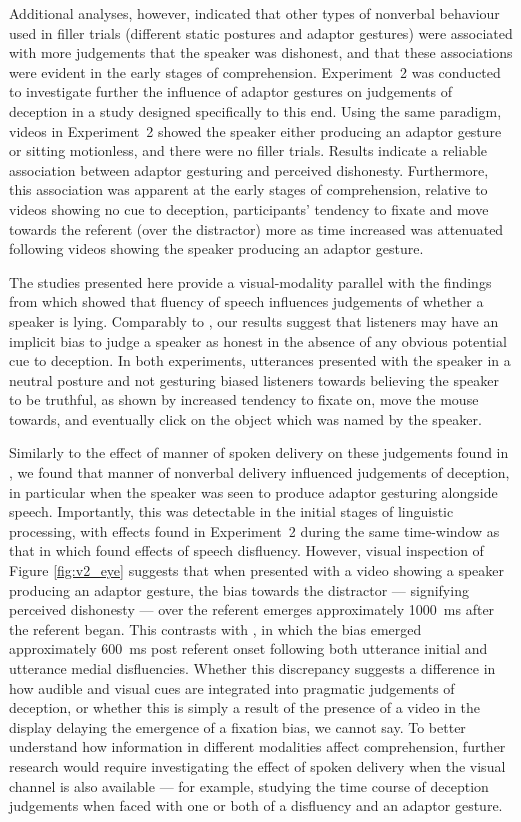 \documentclass[a4paper,man,natbib]{apa6}
\begin{document}
Additional analyses, however, indicated that other types of nonverbal behaviour used in filler trials (different static postures and adaptor gestures) were associated with more judgements that the speaker was dishonest, and that these associations were evident in the early stages of comprehension.
Experiment~2 was conducted to investigate further the influence of adaptor gestures on judgements of deception in a study designed specifically to this end.
Using the same paradigm, videos in Experiment~2 showed the speaker either producing an adaptor gesture or sitting motionless, and there were no filler trials. 
Results indicate a reliable association between adaptor gesturing and perceived dishonesty.
Furthermore, this association was apparent at the early stages of comprehension, relative to videos showing no cue to deception, participants' tendency to fixate and move towards the referent (over the distractor) more as time increased was attenuated following videos showing the speaker producing an adaptor gesture.

The studies presented here provide a visual-modality parallel with the findings from \citet{Loy2017} which showed that fluency of speech influences judgements of whether a speaker is lying.
Comparably to \citet{Loy2017}, our results suggest that listeners may have an implicit bias to judge a speaker as honest in the absence of any obvious potential cue to deception.
In both experiments, utterances presented with the speaker in a neutral posture and not gesturing biased listeners towards believing the speaker to be truthful, as shown by increased tendency to fixate on, move the mouse towards, and eventually click on the object which was named by the speaker. 

Similarly to the effect of manner of spoken delivery on these judgements found in \citet{Loy2017}, we found that manner of nonverbal delivery influenced judgements of deception, in particular when the speaker was seen to produce adaptor gesturing alongside speech.
Importantly, this was detectable in the initial stages of linguistic processing, with effects found in Experiment~2 during the same time-window as that in which \citet{Loy2017} found effects of speech disfluency.
However, visual inspection of Figure \ref{fig:v2_eye} suggests that when presented with a video showing a speaker producing an adaptor gesture, the bias towards the distractor --- signifying perceived dishonesty --- over the referent emerges approximately 1000~ms after the referent began. 
This contrasts with \citet{Loy2017}, in which the bias emerged approximately 600~ms post referent onset following both utterance initial and utterance medial disfluencies. 
Whether this discrepancy suggests a difference in how audible and visual cues are integrated into pragmatic judgements of deception, or whether this is simply a result of the presence of a video in the display delaying the emergence of a fixation bias, we cannot say. 
To better understand how information in different modalities affect comprehension, further research would require investigating the effect of spoken delivery when the visual channel is also available --- for example, studying the time course of deception judgements when faced with one or both of a disfluency and an adaptor gesture.
\end{document}
